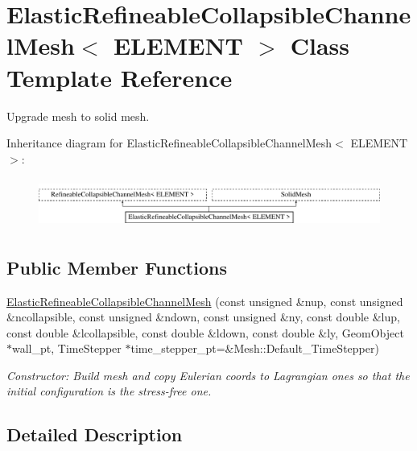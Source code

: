 \hypertarget{classElasticRefineableCollapsibleChannelMesh}{}\section{Elastic\+Refineable\+Collapsible\+Channel\+Mesh$<$ E\+L\+E\+M\+E\+NT $>$ Class Template Reference}
\label{classElasticRefineableCollapsibleChannelMesh}


Upgrade mesh to solid mesh.  


Inheritance diagram for Elastic\+Refineable\+Collapsible\+Channel\+Mesh$<$ E\+L\+E\+M\+E\+NT $>$\+:\begin{figure}[H]
\begin{center}
\leavevmode
\includegraphics[height=1.651917cm]{classElasticRefineableCollapsibleChannelMesh}
\end{center}
\end{figure}
\subsection*{Public Member Functions}
\begin{DoxyCompactItemize}
\item 
\hyperlink{classElasticRefineableCollapsibleChannelMesh_a38336374b6cc91fa4a1c124515d9c2be}{Elastic\+Refineable\+Collapsible\+Channel\+Mesh} (const unsigned \&nup, const unsigned \&ncollapsible, const unsigned \&ndown, const unsigned \&ny, const double \&lup, const double \&lcollapsible, const double \&ldown, const double \&ly, Geom\+Object $\ast$wall\+\_\+pt, Time\+Stepper $\ast$time\+\_\+stepper\+\_\+pt=\&Mesh\+::\+Default\+\_\+\+Time\+Stepper)
\begin{DoxyCompactList}\small\item\em Constructor\+: Build mesh and copy Eulerian coords to Lagrangian ones so that the initial configuration is the stress-\/free one. \end{DoxyCompactList}\end{DoxyCompactItemize}


\subsection{Detailed Description}
